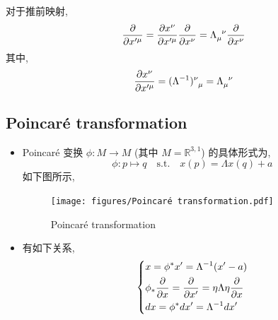 \documentclass[10pt, a4paper]{article}
\numberwithin{equation}{section}
\begin{document}
\begin{itemize}
		\begin{tcolorbox}[title=calculation:]
			对于推前映射,
			\begin{equation}
				\frac{\partial}{\partial x'^\mu} = \frac{\partial x^\nu}{\partial x'^\mu} \frac{\partial}{\partial x^\nu} = \tensor{\Lambda}{_\mu^\nu} \frac{\partial}{\partial x^\nu}
			\end{equation}
			其中,
			\begin{equation}
				\frac{\partial x^\nu}{\partial x'^\mu} = \tensor{(\Lambda^{- 1})}{^\nu_\mu} = \tensor{\Lambda}{_\mu^\nu}
			\end{equation}
		\end{tcolorbox}
	\end{itemize}
	
	\subsection{Poincaré transformation}
	\begin{itemize}
		\item Poincaré 变换 $\phi : M \rightarrow M$ (其中 $M = \mathbb{R}^{3, 1}$) 的具体形式为,
		\begin{equation}
			\phi : p \mapsto q \quad \text{s.t.} \quad x(p) = \Lambda x(q) + a
		\end{equation}
		如下图所示,
		
		\begin{figure}[H]
			\centering
			\texttt{[image: figures/Poincaré transformation.pdf]}
			\caption{Poincaré transformation}
		\end{figure}
		
		\item 有如下关系,
		\begin{equation}
			\begin{dcases}
				x = \phi^* x' = \Lambda^{- 1} (x' - a) \\
				\phi_* \frac{\partial}{\partial x} = \frac{\partial}{\partial x'} = \eta \Lambda \eta \frac{\partial}{\partial x} \\
				dx = \phi^* dx' = \Lambda^{- 1} dx'
			\end{dcases}
		\end{equation}
	\end{itemize}
	
\end{document}
